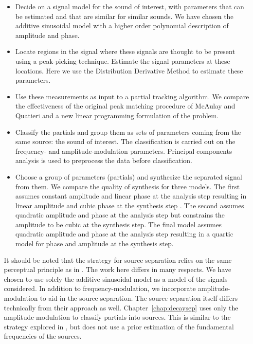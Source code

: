 \begin{itemize}
    \item
        Decide on a signal model for the sound of interest, with parameters that
        can be estimated and that are similar for similar sounds. We have chosen
        the additive sinusoidal model with a higher order polynomial description
        of amplitude and phase.
    \item
        Locate regions in the signal where these signals are thought to be
        present using a peak-picking technique. Estimate the signal parameters
        at these locations. Here we use the Distribution Derivative Method
        \cite{betser2009sinusoidal} to
        estimate these parameters.
    \item
        Use these measurements as input to a partial tracking algorithm. We
        compare the effectiveness of the original peak matching procedure of
        McAulay and Quatieri \cite{mcaulay1986speech} and a new linear
        programming formulation of the problem.
    \item
        Classify the partials and group them as sets of parameters coming from
        the same source: the sound of interest. The classification is carried
        out on the frequency- and amplitude-modulation parameters. Principal
        components analysis is used to preprocess the data before
        classification.
    \item
        Choose a group of parameters (partials) and synthesize the separated
        signal from them. We compare the quality of synthesis for three models.
        The first assumes constant amplitude and linear phase at the analysis
        step resulting in linear amplitude and cubic phase at the synthesis step
        \cite{mcaulay1986speech}. The second assumes quadratic amplitude and
        phase at the analysis step but constrains the amplitude to be cubic at
        the synthesis step. The final model assumes quadratic amplitude and
        phase at the analysis step resulting in a quartic model for phase and
        amplitude at the synthesis step.
\end{itemize}

It should be noted that the strategy for source separation relies on the same
perceptual principle as in \cite{creager2016musicalsource}. The work here differs in many
respects. We have chosen to use solely the additive sinusoidal model as a
model of the signals considered. In addition to
frequency-modulation, we incorporate amplitude-modulation to aid in the source
separation. The source separation itself differs technically from their
approach as well. Chapter~\ref{chap:decaysep} uses only the amplitude-modulation to
classify partials into sources. This is similar to the strategy explored in
\cite{li2009monaural}, but does not use a prior estimation of the fundamental
frequencies of the sources.
